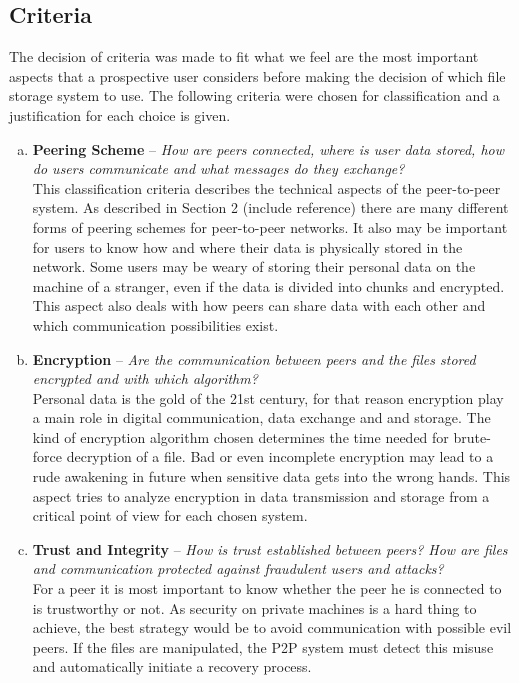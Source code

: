 \subsection{Criteria}
The decision of criteria was made to fit what we feel are the most important aspects that a prospective user considers before making the decision of which file storage system to use. The following criteria were chosen for classification and a justification for each choice is given.

\begin{enumerate}[(a)]
\item \textbf{Peering Scheme} -- \textit{How are peers connected, where is user data stored, how do users communicate and what messages do they exchange?}\\
This classification criteria describes the technical aspects of the peer-to-peer system. As described in Section 2 (include reference) there are many different forms of peering schemes for peer-to-peer networks. It also may be important for users to know how and where their data is physically stored in the network. Some users may be weary of storing their personal data on the machine of a stranger, even if the data is divided into chunks and encrypted. This aspect also deals with how peers can share data with each other and which communication possibilities exist. 

\item \textbf{Encryption} -- \textit{Are the communication between peers and the files stored encrypted and with which algorithm?}\\
Personal data is the gold of the 21st century, for that reason encryption play a main role in digital communication, data exchange and and storage. The kind of encryption algorithm chosen determines the time needed for brute-force decryption of a file. Bad or even incomplete encryption may lead to a rude awakening in future when sensitive data gets into the wrong hands. This aspect tries to analyze encryption in data transmission and storage from a critical point of view for each chosen system.

\item \textbf{Trust and Integrity} -- \textit{How is trust established between peers? How are files and communication protected against fraudulent users and attacks?}\\
For a peer it is most important to know whether the peer he is connected to is trustworthy or not. As security on private machines is a hard thing to achieve, the best strategy would be to avoid communication with possible evil peers. If the files are manipulated, the P2P system must detect this misuse and automatically initiate a recovery process.


\end{enumerate}
